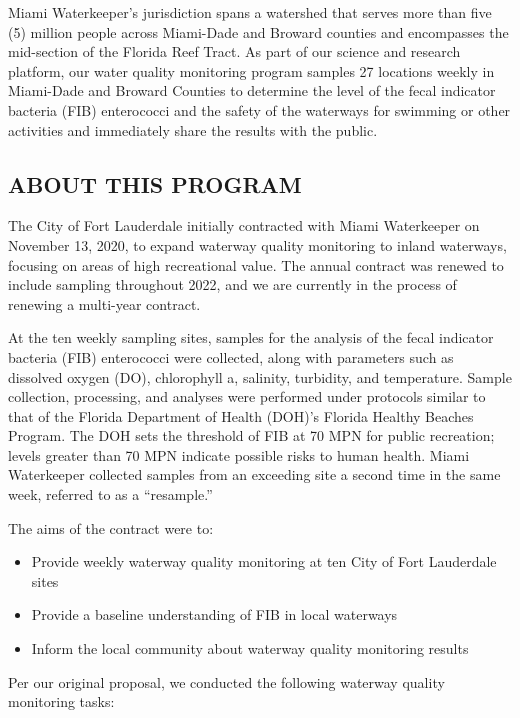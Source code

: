 \documentclass[
]{article}
\begin{document}
Miami Waterkeeper's jurisdiction spans a watershed that serves more than
five (5) million people across Miami-Dade and Broward counties and
encompasses the mid-section of the Florida Reef Tract. As part of our
science and research platform, our water quality monitoring program
samples 27 locations weekly in Miami-Dade and Broward Counties to
determine the level of the fecal indicator bacteria (FIB) enterococci
and the safety of the waterways for swimming or other activities and
immediately share the results with the public.

\hypertarget{about-this-program}{%
\subsection{ABOUT THIS PROGRAM}\label{about-this-program}}

The City of Fort Lauderdale initially contracted with Miami Waterkeeper
on November 13, 2020, to expand waterway quality monitoring to inland
waterways, focusing on areas of high recreational value. The annual
contract was renewed to include sampling throughout 2022, and we are
currently in the process of renewing a multi-year contract.

At the ten weekly sampling sites, samples for the analysis of the fecal
indicator bacteria (FIB) enterococci were collected, along with
parameters such as dissolved oxygen (DO), chlorophyll a, salinity,
turbidity, and temperature. Sample collection, processing, and analyses
were performed under protocols similar to that of the Florida Department
of Health (DOH)'s Florida Healthy Beaches Program. The DOH sets the
threshold of FIB at 70 MPN for public recreation; levels greater than 70
MPN indicate possible risks to human health. Miami Waterkeeper collected
samples from an exceeding site a second time in the same week, referred
to as a ``resample.''

The aims of the contract were to:

\begin{itemize}
\item
  Provide weekly waterway quality monitoring at ten City of Fort
  Lauderdale sites
\item
  Provide a baseline understanding of FIB in local waterways
\item
  Inform the local community about waterway quality monitoring results
\end{itemize}

Per our original proposal, we conducted the following waterway quality
monitoring tasks:
\end{document}
